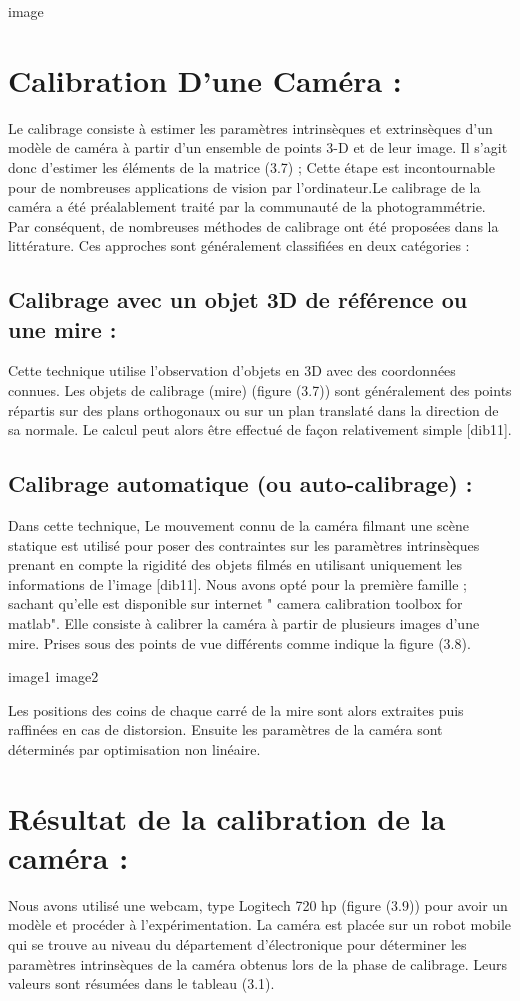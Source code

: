 image

\section{Calibration D'une Caméra :}
Le calibrage consiste à estimer les paramètres intrinsèques et extrinsèques d'un modèle de 
caméra à partir d'un ensemble de points 3-D et de leur image. Il s'agit donc d'estimer les 
éléments de la matrice (3.7) ; Cette étape est incontournable pour de nombreuses applications 
de vision par l’ordinateur.Le calibrage de la caméra a été préalablement traité par la communauté de la 
photogrammétrie. Par conséquent, de nombreuses méthodes de calibrage ont été proposées
dans la littérature. Ces approches sont généralement classifiées en deux catégories :
\subsection{Calibrage avec un objet 3D de référence ou une mire :}
Cette technique utilise l’observation d’objets en 3D avec des coordonnées connues. Les 
objets de calibrage (mire) (figure (3.7)) sont généralement des points répartis sur des plans 
orthogonaux ou sur un plan translaté dans la direction de sa normale. Le calcul peut alors être 
effectué de façon relativement simple [dib11].
\subsection{Calibrage automatique (ou auto-calibrage) :}
Dans cette technique, Le mouvement connu de la caméra filmant une scène statique est 
utilisé pour poser des contraintes sur les paramètres intrinsèques prenant en compte la rigidité 
des objets filmés en utilisant uniquement les informations de l’image [dib11].
Nous avons opté pour la première famille ; sachant qu'elle est disponible sur internet " 
camera calibration toolbox for matlab". Elle consiste à calibrer la caméra à partir de 
plusieurs images d'une mire. Prises sous des points de vue différents comme indique la figure
(3.8).

image1
image2

Les positions des coins de chaque carré de la mire sont alors extraites puis raffinées en 
cas de distorsion. Ensuite les paramètres de la caméra sont déterminés par optimisation non 
linéaire.
\section{Résultat de la calibration de la caméra :}
Nous avons utilisé une webcam, type Logitech 720 hp (figure (3.9)) pour avoir un 
modèle et procéder à l'expérimentation. La caméra est placée sur un robot mobile qui se 
trouve au niveau du département d'électronique pour déterminer les paramètres intrinsèques 
de la caméra obtenus lors de la phase de calibrage. Leurs valeurs sont résumées dans le 
tableau (3.1).

